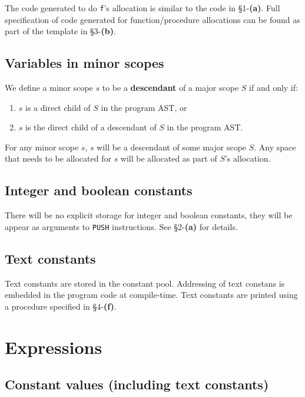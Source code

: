 \documentclass[11pt]{article}
\begin{document}
The code generated to do \texttt{f}'s allocation is similar to the code in \S 1-\textbf{(a)}. Full specification of code generated for function/procedure allocations can be found as part of the template in \S 3-\textbf{(b)}.

\subsection{Variables in minor scopes}

We define a minor scope $s$ to be a \textbf{descendant} of a major scope $S$ if and only if:
	\begin{enumerate}[label=(\arabic*)]
	\item $s$ is a direct child of $S$ in the program AST, or
    \item $s$ is the direct child of a descendant of $S$ in the program AST.
	\end{enumerate}
    
For any minor scope $s$, $s$ will be a descendant of some major scope $S$. Any space that needs to be allocated for $s$ will be allocated as part of $S$'s allocation.

\subsection{Integer and boolean constants}

There will be no explicit storage for integer and boolean constants, they will be appear as arguments to \texttt{PUSH} instructions. See \S 2-\textbf{(a)} for details.

\subsection{Text constants}

Text constants are stored in the constant pool. Addressing of text constans is embedded in the program code at compile-time. Text constants are printed using a procedure specified in \S 4-\textbf{(f)}.

\section{Expressions}

\subsection{Constant values (including text constants)}
\end{document}

